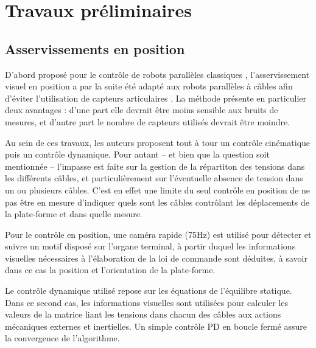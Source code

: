 \section{Travaux pr\'eliminaires}

\subsection{Asservissements en position}

D'abord propos\'e pour le contr\^ole de robots parall\`eles classiques \cite{dallej.2006}, l'asservissement visuel en position a par la suite \'et\'e adapt\'e aux robots parall\`eles \`a c\^ables afin d'\'eviter l'utilisation de capteurs articulaires \cite{dallej2012} \cite{dallej2011}. La m\'ethode pr\'esente en particulier deux avantages : d'une part elle devrait \^etre moins sensible aux bruits de mesures, et d'autre part le nombre de capteurs utilis\'es devrait \^etre moindre.

Au sein de ces travaux, les auteurs proposent tout \`a tour un contr\^ole cin\'ematique puis un contr\^ole dynamique. Pour autant -- et bien que la question soit mentionn\'ee -- l'impasse est faite sur la gestion de la r\'epartiton des tensions dans les diff\'erents c\^ables, et particuli\`erement sur l'\'eventuelle absence de tension dans un ou plusieurs c\^ables. C'est en effet une limite du seul contr\^ole en position de ne pas \^etre en mesure d'indiquer quels sont les c\^ables contr\^olant les d\'eplacements de la plate-forme et dans quelle mesure.

Pour le contr\^ole en position, une cam\'era rapide (75Hz) est utilis\'e pour d\'etecter et suivre un motif dispos\'e sur l'organe terminal, \`a partir duquel les informations visuelles n\'ecessaires \`a l'\'elaboration de la loi de commande sont d\'eduites, à savoir dans ce cas la position et l'orientation de la plate-forme.

Le contrôle dynamique utilisé repose sur les équations de l'équilibre statique. Dans ce second cas, les informations visuelles sont utilisées pour calculer les valeurs de la matrice liant les tensions dans chacun des câbles aux actions mécaniques externes et inertielles. Un simple contrôle PD en boucle fermé assure la convergence de l'algorithme.

